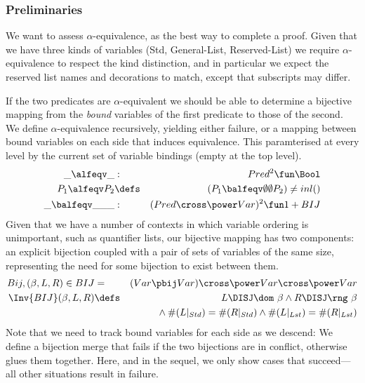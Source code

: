 \subsubsection{Preliminaries}

We want to assess $\alpha$-equivalence,
as the best way to complete a proof.
Given that we have three kinds of variables (Std, General-List, Reserved-List)
we require $\alpha$-equivalence to respect the kind distinction,
and in particular we expect the reserved list names and decorations to match,
except that subscripts may differ.

If the two predicates are $\alpha$-equivalent we should be able to determine
a bijective mapping from the \emph{bound} variables of the first predicate to those of the second.
We define $\alpha$-equivalence recursively,
yielding either failure, or a mapping between bound variables
on each side that induces equivalence.
This paramterised at every level by the current set of variable bindings
(empty at the top level).
\begin{eqnarray*}
   \_\alfeqv\_ &:& Pred^2 \fun \Bool
\\ P_1 \alfeqv P_2
   &\defs&
   (P_1 \balfeqv\emptyset\emptyset P_2) \neq  inl()
\\ \_ \balfeqv\_\_ \_ &:& (Pred\cross \power Var)^2 \fun 1 + BIJ
\end{eqnarray*}
Given that we have a number of contexts in which variable ordering is unimportant,
such as quantifier lists, our bijective mapping has two components:
an explicit bijection coupled with a pair of sets of variables of the same size,
representing the need for some bijection to exist between them.
\begin{eqnarray*}
  Bij,(\beta,L,R) \in  BIJ
  &=&  (Var \pbij Var) \cross \power Var \cross \power Var
\\ \Inv{BIJ}(\beta,L,R)
  &\defs&
  L \DISJ \dom~\beta
  \land
  R \DISJ \rng~\beta
\\ && {} \land
  \#(L|_{Std}) = \#(R|_{Std})
  \land
  \#(L|_{Lst}) = \#(R|_{Lst})
\end{eqnarray*}
Note that we need to track bound variables for each side
as we descend:
We define a bijection merge that fails if the two bijections are in conflict,
otherwise glues them together.
Here, and in the sequel, we only show cases that succeed---all other situations
result in failure.
